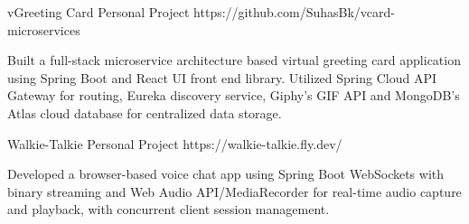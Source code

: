 \documentclass[10pt]{article}
\begin{document}
{        \project
        {vGreeting Card}
        {Personal Project}
        {https://github.com/SuhasBk/vcard-microservices}
        {\begin{newitemize}
            \item {Built a full-stack microservice architecture based virtual greeting card application using Spring Boot and React UI front end library. Utilized Spring Cloud API Gateway for routing, Eureka discovery service, Giphy's GIF API and MongoDB's Atlas cloud database for centralized data storage.}
	\end{newitemize}}

 

        \project
        {Walkie-Talkie}
        {Personal Project}
        {https://walkie-talkie.fly.dev/}
        {\begin{newitemize}
            \item Developed a browser-based voice chat app using Spring Boot WebSockets with binary streaming and Web Audio API/MediaRecorder for real-time audio capture and playback, with concurrent client session management.
        \end{newitemize}}

}
\end{document}
